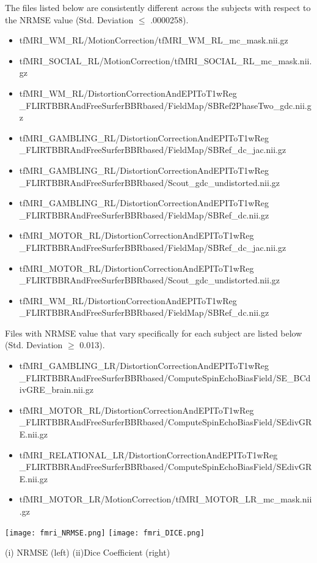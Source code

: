 The files listed below are consistently different across the subjects with respect to the NRMSE value (Std. Deviation $\leq$ .0000258).
\begin{itemize}
  \item {tfMRI\_WM\_RL/MotionCorrection/tfMRI\_WM\_RL\_mc\_mask.nii.gz}
  \item {tfMRI\_SOCIAL\_RL/MotionCorrection/tfMRI\_SOCIAL\_RL\_mc\_mask.nii.gz}
  \item {tfMRI\_WM\_RL/DistortionCorrectionAndEPIToT1wReg
          \_FLIRTBBRAndFreeSurferBBRbased/FieldMap/SBRef2PhaseTwo\_gdc.nii.gz}
  \item {tfMRI\_GAMBLING\_RL/DistortionCorrectionAndEPIToT1wReg
          \_FLIRTBBRAndFreeSurferBBRbased/FieldMap/SBRef\_dc\_jac.nii.gz}
  \item {tfMRI\_GAMBLING\_RL/DistortionCorrectionAndEPIToT1wReg
          \_FLIRTBBRAndFreeSurferBBRbased/Scout\_gdc\_undistorted.nii.gz}
  \item {tfMRI\_GAMBLING\_RL/DistortionCorrectionAndEPIToT1wReg
          \_FLIRTBBRAndFreeSurferBBRbased/FieldMap/SBRef\_dc.nii.gz}
  \item {tfMRI\_MOTOR\_RL/DistortionCorrectionAndEPIToT1wReg
          \_FLIRTBBRAndFreeSurferBBRbased/FieldMap/SBRef\_dc\_jac.nii.gz}
  \item {tfMRI\_MOTOR\_RL/DistortionCorrectionAndEPIToT1wReg
          \_FLIRTBBRAndFreeSurferBBRbased/Scout\_gdc\_undistorted.nii.gz}
  \item {tfMRI\_WM\_RL/DistortionCorrectionAndEPIToT1wReg
          \_FLIRTBBRAndFreeSurferBBRbased/FieldMap/SBRef\_dc.nii.gz}
\end{itemize}

Files with NRMSE value that vary specifically for each subject are listed below (Std. Deviation $\geq$ 0.013).
\begin{itemize}
  \item {tfMRI\_GAMBLING\_LR/DistortionCorrectionAndEPIToT1wReg
         \_FLIRTBBRAndFreeSurferBBRbased/ComputeSpinEchoBiasField/SE\_BCdivGRE\_brain.nii.gz}
  \item {tfMRI\_MOTOR\_RL/DistortionCorrectionAndEPIToT1wReg
         \_FLIRTBBRAndFreeSurferBBRbased/ComputeSpinEchoBiasField/SEdivGRE.nii.gz}
  \item {tfMRI\_RELATIONAL\_LR/DistortionCorrectionAndEPIToT1wReg
         \_FLIRTBBRAndFreeSurferBBRbased/ComputeSpinEchoBiasField/SEdivGRE.nii.gz}
  \item {tfMRI\_MOTOR\_LR/MotionCorrection/tfMRI\_MOTOR\_LR\_mc\_mask.nii.gz}
\end{itemize}

\begin{center}
\texttt{[image: fmri\_NRMSE.png]}%
\texttt{[image: fmri\_DICE.png]}
\caption*{(i) NRMSE (left) (ii)Dice Coefficient (right)}
\label{fig:fMRI_metric_values}
\end{center}
